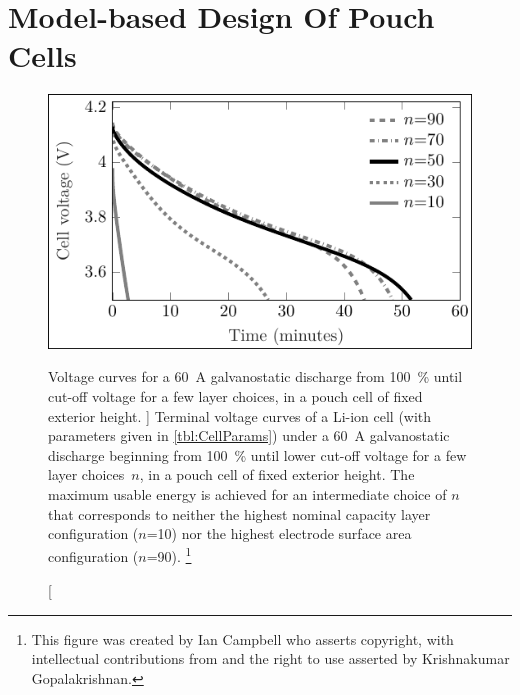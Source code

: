 
\graphicspath{{chapters/layer_opt/figures/}}

\chapter{Model-based Design Of Pouch Cells}\label{ch:modelbaseddesign}
\vspace*{-1em}
\startcontents[chapters]

\bigskip

\begin{figure}[!bp]
    \begin{minipage}[t]{\textwidth}
        \centering
        \includegraphics[trim=4 4 2 4,clip]{fig_CC_discharge_curves.pdf}
        \caption
        [%
        Voltage  curves   for  a   \SI{60}{\ampere}  galvanostatic   discharge  from
        \SI{100}{\percent}   until cut-off voltage for  a few layer
        choices, in a pouch cell of fixed exterior height.
        ]%
        {%
            Terminal  voltage curves  of a  Li-ion  cell (with  parameters given  in
            \cref{tbl:CellParams}) under a  \SI{60}{\ampere} galvanostatic discharge
            beginning from \SI{100}{\percent}   until lower cut-off
            voltage for a  few layer choices~$n$, in a pouch  cell of fixed exterior
            height. The maximum usable energy is achieved for an intermediate choice
            of $n$  that corresponds to  neither the highest nominal  capacity layer
            configuration  ($n$=\num{10}) nor  the  highest  electrode surface  area
            configuration ($n$=\num{90})\footnotemark.
        }%
        \label{fig:fig_CC_discharge_curves}
        \mpfootnotes[1]
        \footnote{This figure was created by Ian Campbell who asserts copyright,
            with  intellectual  contributions  from  and   the  right  to  use  asserted  by
        Krishnakumar Gopalakrishnan.}
    \end{minipage}
\end{figure}

